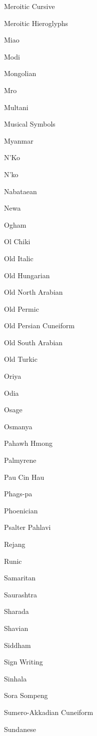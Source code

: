 \documentclass[a4paper]{l3doc}
\begin{document}
\begin{table}[!hbp]
\begin{multicols}{4}
    Meroitic Cursive \par
    Meroitic Hieroglyphs \par
    Miao \par
    Modi \par
    Mongolian \par
    Mro \par
    Multani \par
    Musical Symbols \par
    Myanmar \par
    \dup N'Ko \par
    \dup N'ko \par
    Nabataean \par
    Newa \par
    Ogham \par
    Ol Chiki \par
    Old Italic \par
    Old Hungarian \par
    Old North Arabian \par
    Old Permic \par
    Old Persian Cuneiform \par
    Old South Arabian \par
    Old Turkic \par
    \dup Oriya \par
    \dup Odia \par
    Osage \par
    Osmanya \par
    Pahawh Hmong \par
    Palmyrene \par
    Pau Cin Hau \par
    Phags-pa \par
    Phoenician \par
    Psalter Pahlavi \par
    Rejang \par
    Runic \par
    Samaritan \par
    Saurashtra \par
    Sharada \par
    Shavian \par
    Siddham \par
    Sign Writing \par
    Sinhala \par
    Sora Sompeng \par
    Sumero-Akkadian Cuneiform \par
    Sundanese \par

\end{multicols}
\end{table}
\end{document}
